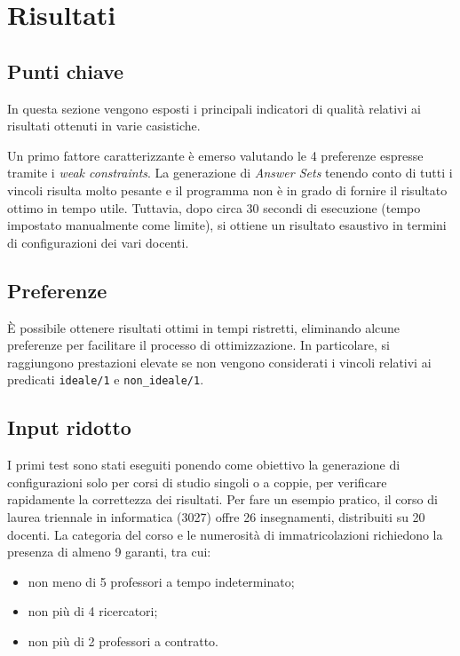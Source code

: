 \section{Risultati}

\subsection{Punti chiave}
In questa sezione vengono esposti i principali indicatori di qualità 
relativi ai risultati ottenuti in varie casistiche.

Un primo fattore caratterizzante è emerso valutando le 4 preferenze espresse 
tramite i \textit{weak constraints}. La generazione di \textit{Answer Sets} 
tenendo conto di tutti i vincoli risulta molto pesante e il programma non è 
in grado di fornire il risultato ottimo in tempo utile.
Tuttavia, dopo circa 30 secondi di esecuzione (tempo impostato manualmente come limite),
si ottiene un risultato esaustivo in termini di configurazioni dei vari docenti.

\subsection{Preferenze}
È possibile ottenere risultati ottimi in tempi ristretti, eliminando alcune 
preferenze per facilitare il processo di ottimizzazione. In particolare, si raggiungono
prestazioni elevate se non vengono considerati i vincoli relativi ai predicati 
\texttt{ideale/1} e \texttt{non\_ideale/1}.

\subsection{Input ridotto}
I primi test sono stati eseguiti ponendo come obiettivo la generazione di 
configurazioni solo per corsi di studio singoli o a coppie, per verificare 
rapidamente la correttezza dei risultati.
Per fare un esempio pratico, il corso di laurea triennale in informatica (3027)
offre 26 insegnamenti, distribuiti su 20 docenti.
La categoria del corso e le numerosità di immatricolazioni richiedono 
la presenza di almeno 9 garanti, tra cui:
\begin{itemize}
    \item non meno di 5 professori a tempo indeterminato;
    \item non più di 4 ricercatori;
    \item non più di 2 professori a contratto.
\end{itemize}

